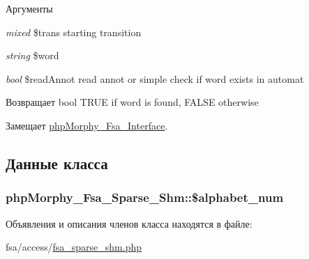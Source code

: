 \begin{DoxyParams}{Аргументы}
\item[{\em mixed}]\$trans starting transition \item[{\em string}]\$word \item[{\em bool}]\$readAnnot read annot or simple check if word exists in automat \end{DoxyParams}
\begin{DoxyReturn}{Возвращает}
bool TRUE if word is found, FALSE otherwise 
\end{DoxyReturn}


Замещает \hyperlink{interfacephpMorphy__Fsa__Interface_a6e249e8e54705e4c1d9399ff0e491ce0}{phpMorphy\_\-Fsa\_\-Interface}.



\subsection{Данные класса}
\hypertarget{classphpMorphy__Fsa__Sparse__Shm_a4abf1fad6e563273380b08c6e42d3723}{
\subsubsection[{\$alphabet\_\-num}]{\setlength{\rightskip}{0pt plus 5cm}phpMorphy\_\-Fsa\_\-Sparse\_\-Shm::\$alphabet\_\-num}}
\label{classphpMorphy__Fsa__Sparse__Shm_a4abf1fad6e563273380b08c6e42d3723}


Объявления и описания членов класса находятся в файле:\begin{DoxyCompactItemize}
\item 
fsa/access/\hyperlink{fsa__sparse__shm_8php}{fsa\_\-sparse\_\-shm.php}\end{DoxyCompactItemize}
